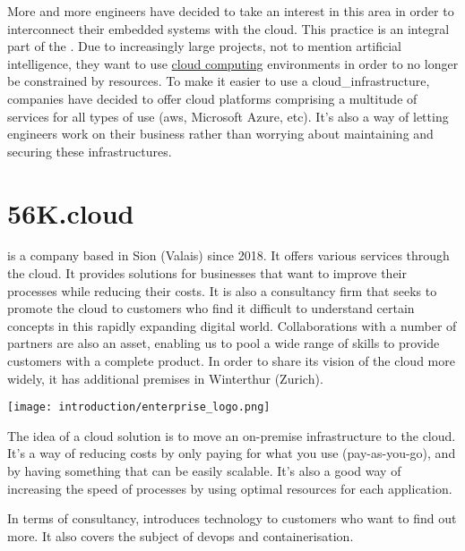 More and more engineers have decided to take an interest in this area in order to interconnect their embedded systems with the \gls{cloud}. This practice is an integral part of the . Due to increasingly large projects, not to mention artificial intelligence, they want to use \hyperref[subsec:cloudcomputing]{cloud computing} environments in order to no longer be constrained by resources. To make it easier to use a \gls{cloud_infrastructure}, companies have decided to offer \gls{cloud} platforms comprising a multitude of services for all types of use (\gls{aws}, Microsoft Azure, etc). It's also a way of letting engineers work on their business rather than worrying about maintaining and securing these infrastructures.


\section{56K.\Gls{cloud}}
\label{subsec:56k.cloud}

 is a company based in Sion (Valais) since 2018. It offers various services through the \gls{cloud}. It provides solutions for businesses that want to improve their processes while reducing their costs. It is also a consultancy firm that seeks to promote the \gls{cloud} to customers who find it difficult to understand certain concepts in this rapidly expanding digital world. Collaborations with a number of partners are also an asset, enabling us to pool a wide range of skills to provide customers with a complete product. In order to share its vision of the \gls{cloud} more widely, it has additional premises in Winterthur (Zurich).
\begin{center}
    \begingroup
    \texttt{[image: introduction/enterprise\_logo.png]}
    \label{fig:enterprise_logo}
    \endgroup
\end{center}
The idea of a \gls{cloud} solution is to move an on-premise infrastructure to the \gls{cloud}. It's a way of reducing costs by only paying for what you use (pay-as-you-go), and by having something that can be easily scalable. It's also a good way of increasing the speed of processes by using optimal resources for each application.

In terms of consultancy,  introduces  technology to customers who want to find out more. It also covers the subject of \acrshort{devops} and containerisation.


